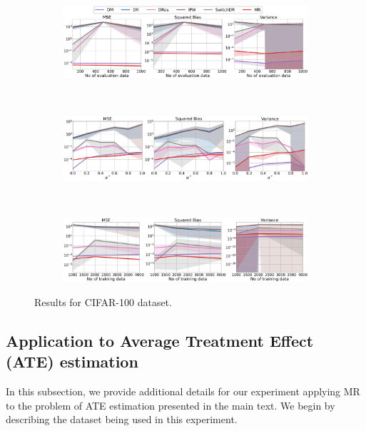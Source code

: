 \begin{figure}[h!]
    \centering
	\begin{subfigure}{0.8\textwidth}
	    \centering
	    \includegraphics[width=1\textwidth]{figures/mr/multiclass/cifar100n_eval.png}
	    \label{subfig:cifar100-neval}
	\end{subfigure}\\
	\begin{subfigure}{0.8\textwidth} 
	    \centering
	    \includegraphics[width=1\textwidth]{figures/mr/multiclass/cifar100alpha_star.png}
	    \label{subfig:cifar-ae}
	\end{subfigure}\\
 	\begin{subfigure}{0.8\textwidth} 
	    \centering
	    \includegraphics[width=1\textwidth]{figures/mr/multiclass/cifar100n_train.png}
	    \label{subfig:cifar100-tr}
	\end{subfigure}
    \caption{Results for CIFAR-100 dataset.}
    \label{fig:cifar100}
\end{figure}

\subsection{Application to Average Treatment Effect (ATE) estimation}\label{app:ate-empirical}
In this subsection, we provide additional details for our experiment applying MR to the problem of ATE estimation presented in the main text. We begin by describing the dataset being used in this experiment.

